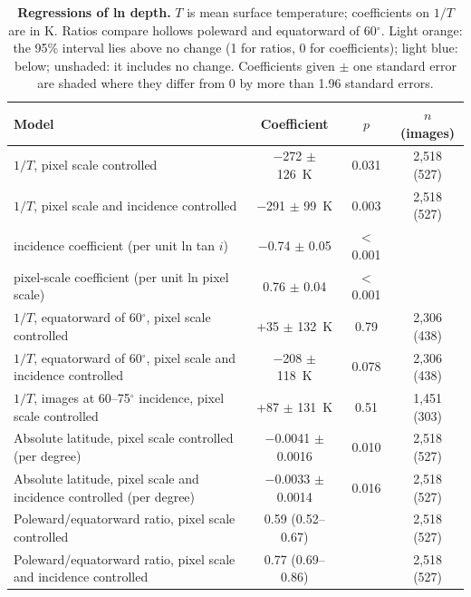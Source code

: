 \documentclass{planetary}
\begin{document}
\begin{table}[!ht]
    \mytablestyle
    \caption{{\bf Regressions of ln depth.} $T$ is mean surface temperature; coefficients on $1/T$ are in K. Ratios compare hollows poleward and equatorward of 60$^\circ$. Light orange: the 95\% interval lies above no change (1 for ratios, 0 for coefficients); light blue: below; unshaded: it includes no change. Coefficients given $\pm$ one standard error are shaded where they differ from 0 by more than 1.96 standard errors.}
    \footnotesize{
        \begin{tabularx}{\textwidth}{>{\raggedright\arraybackslash}X c c c}
            \toprule
            \textbf{Model} & \textbf{Coefficient} & \textbf{$p$} & \textbf{$n$ (images)} \\
            \hline
            $1/T$, pixel scale controlled & \cellcolor[HTML]{DCE7F3}$-$272 $\pm$ 126~K & 0.031 & 2,518 (527) \\
            $1/T$, pixel scale and incidence controlled & \cellcolor[HTML]{DCE7F3}$-$291 $\pm$ 99~K & 0.003 & 2,518 (527) \\
            \quad incidence coefficient (per unit ln tan $i$) & \cellcolor[HTML]{DCE7F3}$-$0.74 $\pm$ 0.05 & $<$ 0.001 & \\
            \quad pixel-scale coefficient (per unit ln pixel scale) & \cellcolor[HTML]{FBE3D6}0.76 $\pm$ 0.04 & $<$ 0.001 & \\
            $1/T$, equatorward of 60$^\circ$, pixel scale controlled & +35 $\pm$ 132~K & 0.79 & 2,306 (438) \\
            $1/T$, equatorward of 60$^\circ$, pixel scale and incidence controlled & $-$208 $\pm$ 118~K & 0.078 & 2,306 (438) \\
            $1/T$, images at 60--75$^\circ$ incidence, pixel scale controlled & +87 $\pm$ 131~K & 0.51 & 1,451 (303) \\
            Absolute latitude, pixel scale controlled (per degree) & \cellcolor[HTML]{DCE7F3}$-$0.0041 $\pm$ 0.0016 & 0.010 & 2,518 (527) \\
            Absolute latitude, pixel scale and incidence controlled (per degree) & \cellcolor[HTML]{DCE7F3}$-$0.0033 $\pm$ 0.0014 & 0.016 & 2,518 (527) \\
            Poleward/equatorward ratio, pixel scale controlled & \cellcolor[HTML]{DCE7F3}0.59 (0.52--0.67) & & 2,518 (527) \\
            Poleward/equatorward ratio, pixel scale and incidence controlled & \cellcolor[HTML]{DCE7F3}0.77 (0.69--0.86) & & 2,518 (527) \\
            \hline
        \end{tabularx}}
    \label{tab:depthreg}
\end{table}
\end{document}
